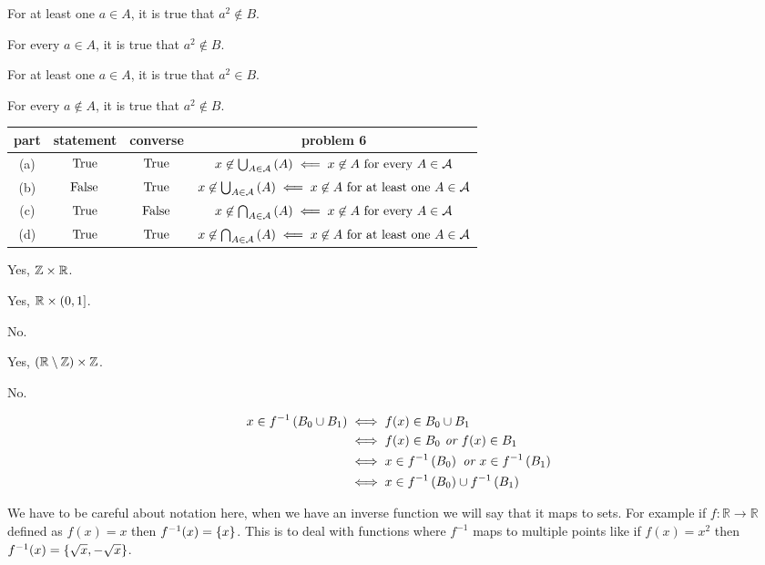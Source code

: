 \documentclass{article}
\begin{document}
 For at least one $a \in A$, it is true that $a^2 \not\in B$.

 For every $a \in A$, it is true that $a^2 \not\in B$.

 For at least one $a \in A$, it is true that $a^2 \in B$.

 For every $a \not\in A$, it is true that $a^2 \not\in B$.


\begin{center}
\begin{tabular}{c|c|c|c}
part & statement & converse & problem 6 \\
\hline
(a) & $\text{True}$ & $\text{True}$ & $x\not\in \bigcup_{A \in \mathcal A}^{} \left( {A} \right) \impliedby x \not\in A \text{ for every } A \in \mathcal A$\\
(b) & $\text{False}$ & $\text{True}$ & $x \not\in \bigcup_{A \in\mathcal A}^{} \left( {A} \right) \impliedby x \not\in A \text{ for at least one } A \in \mathcal A$\\
(c) & $\text{True}$ & $\text{False}$ & $x\not\in\bigcap_{A \in \mathcal A}^{} \left( {A} \right) \impliedby x \not\in A \text{ for every } A \in\mathcal A$\\
(d) & $\text{True}$ & $\text{True}$ & $x \not\in\bigcap_{A \in\mathcal A}^{} \left( {A} \right) \impliedby x \not\in A \text{ for at least one } A \in\mathcal A$
\end{tabular}
\end{center}

 Yes, $\mathbb Z \times \mathbb R$.

 Yes, $\mathbb R \times \left( 0 , 1 \right]$.

 No.

 Yes, $(\mathbb R \setminus \mathbb Z) \times \mathbb Z$.

 No.

\begin{align*}
x\in f^{-1}\left(B_0 \cup B_1\right) &\iff f(x) \in B_0 \cup B_1 \\
&\iff f(x) \in B_0 \textit{ or } f(x) \in B_1 \\
&\iff x \in f^{-1}\left(B_0\right) \textit{ or } x \in f^{-1}\left(B_1\right) \\
&\iff x \in f^{-1}\left(B_0\right) \cup f^{-1}\left(B_1\right)
\end{align*}

 We have to be careful about notation here, when we have an inverse function we will say that it maps to sets. For example if $f:\mathbb R \to \mathbb R$ defined as $f(x)=x$ then $f^{-1}(x)=\left\{ {x} \right\}$. This is to deal with functions where $f^{-1}$ maps to multiple points like if $f(x)=x^2$ then $f^{-1}(x) = \left\{ {\sqrt x, -\sqrt x} \right\}$.
\end{document}
